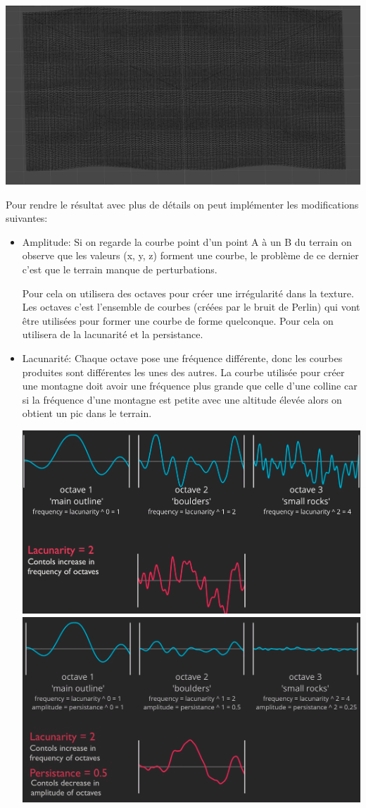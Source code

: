 \begin{center}
    \centering
    \includegraphics[height = 3 cm]{images/exemple_maillage.png}
\end{center}


Pour rendre le résultat avec plus de détails on peut implémenter les modifications suivantes: 

\begin{itemize}

\item Amplitude: Si on regarde la courbe point d'un point A à un B du terrain on observe que les valeurs (x, y, z) forment une courbe, le problème de ce dernier c'est que le terrain manque de perturbations.
	
     Pour cela on utilisera des octaves pour créer une irrégularité dans la texture. Les octaves c'est l'ensemble de courbes (créées par le bruit de Perlin) qui vont être utilisées pour former une courbe de forme quelconque. Pour cela on utilisera de la lacunarité et la persistance.
    
\item Lacunarité: Chaque octave pose une fréquence différente, donc les courbes produites sont différentes les unes des autres. La courbe utilisée pour créer une montagne doit avoir une fréquence plus grande que celle d'une colline car si la fréquence d'une montagne est petite avec une altitude élevée alors on obtient un pic dans le terrain.

\begin{center}
\centering
\includegraphics[height = 3 cm]{images/lacunarity.png}
\includegraphics[height = 3 cm]{images/persistance.png}\\
\end{center}


\end{itemize}
